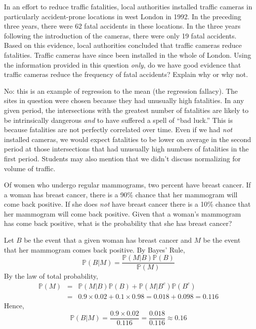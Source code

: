 \documentclass[addpoints,12pt]{exam}
\newcommand{\p}{\mathbb{P}}
\begin{document}
\newpage
\begin{questions}


\question[10] In an effort to reduce traffic fatalities, local authorities installed traffic cameras in particularly accident-prone locations in west London in 1992. In the preceding three years, there were 62 fatal accidents in these locations. In the three years following the introduction of the cameras, there were only 19 fatal accidents. Based on this evidence, local authorities concluded that traffic cameras reduce fatalities. Traffic cameras have since been installed in the whole of London. Using the information provided in this question \emph{only}, do we have good evidence that traffic cameras reduce the frequency of fatal accidents? Explain why or why not.
	\begin{solution}[2.8in]
	 No: this is an example of regression to the mean (the regression fallacy). The sites in question were chosen because they had unusually high fatalities. In any given period, the intersections with the greatest number of fatalities are likely to be intrinsically dangerous \emph{and} to have suffered a spell of ``bad luck.'' This is because fatalities are not perfectly correlated over time. Even if we had \emph{not} installed cameras, we would expect fatalities to be lower on average in the second period at those intersections that had unusually high numbers of fatalities in the first period. Students may also mention that we didn't discuss normalizing for volume of traffic.
	\end{solution}

\question[10] Of women who undergo regular mammograms, two percent have breast cancer. If a woman has breast cancer, there is a 90\% chance that her mammogram will come back positive. If she does \emph{not} have breast cancer there is a 10\% chance that her mammogram will come back positive. Given that a woman's mammogram has come back positive, what is the probability that she has breast cancer? 
	\begin{solution}[2.8in]
		 Let $B$ be the event that a given woman has breast cancer and $M$ be the event that her mammogram comes back positive. By Bayes' Rule,
		 		$$\p(B|M) = \frac{\p(M|B)\p(B)}{\p(M)}$$
	By the law of total probability, 
		 			\begin{eqnarray*}
		 			\p(M) &=& \p(M|B)\p(B) + \p(M|B^c)\p(B^c)\\
		 				&=& 0.9 \times 0.02 + 0.1 \times 0.98  = 0.018 + 0.098 = 0.116
		 			\end{eqnarray*}
		 	Hence,
		 		$$\p(B|M) = \frac{0.9 \times 0.02}{0.116} = \frac{0.018}{0.116} \approx 0.16$$
	\end{solution}



\end{questions}
\end{document}

